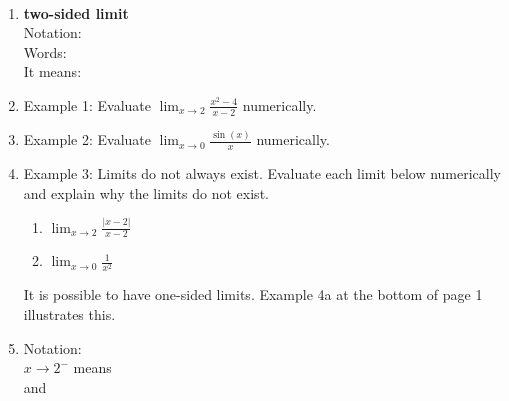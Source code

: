 \documentclass[11pt,fleqn]{article}
\begin{document}
\renewcommand{\headrulewidth}{0pt}
\newcommand{\blank}[1]{\rule{#1}{0.75pt}}
\newcommand{\bc}{\begin{center}}
\newcommand{\ec}{\end{center}}
\renewcommand{\d}{\displaystyle}

\vspace*{-0.7in}

\begin{center}
  \LARGE
  \\
\end{center}
\begin{enumerate}
\item {} \textbf{two-sided limit}\\

Notation: \\

Words: \\

It means: \\
\vspace{0.5in}

\item Example 1: Evaluate $\d \lim_{x \to 2}\frac{x^2-4}{x-2} $ numerically.

\vspace{1.5in}

\item Example 2: Evaluate $\d \lim_{x \to 0}\frac{\sin(x)}{x } $ numerically. 

\vspace{1.5in}

\item Example 3: Limits do not always exist. Evaluate each limit below numerically and explain why the limits do not exist.
\begin{enumerate}
	\item $\d \lim_{x \to 2}\frac{|x-2|}{x-2 } $
	\vfill
	\item $\d \lim_{x \to 0}\frac{1}{x^2 } $
	\vfill
\end{enumerate}
\newpage
It is possible to have one-sided limits. Example 4a at the bottom of page 1 illustrates this.

\item Notation: \\

 $x \to 2^-$ means \\
 
 and\\
 

\end{enumerate}
\end{document}
